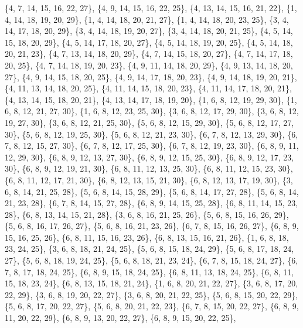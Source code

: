 \documentclass[11pt,a4paper]{article}
\begin{document}
{\{4, 7, 14, 15, 16, 22, 27\}, \{4, 9, 14, 15, 16, 22, 25\}, \{4, 13, 14, 15, 16, 21, 22\}, \{1, 4, 14, 18, 19, 20, 29\}, \{1, 4, 14, 18, 20, 21, 27\},
\{1, 4, 14, 18, 20, 23, 25\}, \{3, 4, 14, 17, 18, 20, 29\}, \{3, 4, 14, 18, 19, 20, 27\}, \{3, 4, 14, 18, 20, 21, 25\}, \{4, 5, 14, 15, 18, 20, 29\},
\{4, 5, 14, 17, 18, 20, 27\}, \{4, 5, 14, 18, 19, 20, 25\}, \{4, 5, 14, 18, 20, 21, 23\}, \{4, 7, 13, 14, 18, 20, 29\}, \{4, 7, 14, 15, 18, 20, 27\},
\{4, 7, 14, 17, 18, 20, 25\}, \{4, 7, 14, 18, 19, 20, 23\}, \{4, 9, 11, 14, 18, 20, 29\}, \{4, 9, 13, 14, 18, 20, 27\}, \{4, 9, 14, 15, 18, 20, 25\},
\{4, 9, 14, 17, 18, 20, 23\}, \{4, 9, 14, 18, 19, 20, 21\}, \{4, 11, 13, 14, 18, 20, 25\}, \{4, 11, 14, 15, 18, 20, 23\}, \{4, 11, 14, 17, 18, 20, 21\},
\{4, 13, 14, 15, 18, 20, 21\}, \{4, 13, 14, 17, 18, 19, 20\}, \{1, 6, 8, 12, 19, 29, 30\}, \{1, 6, 8, 12, 21, 27, 30\}, \{1, 6, 8, 12, 23, 25, 30\},
\{3, 6, 8, 12, 17, 29, 30\}, \{3, 6, 8, 12, 19, 27, 30\}, \{3, 6, 8, 12, 21, 25, 30\}, \{5, 6, 8, 12, 15, 29, 30\}, \{5, 6, 8, 12, 17, 27, 30\},
\{5, 6, 8, 12, 19, 25, 30\}, \{5, 6, 8, 12, 21, 23, 30\}, \{6, 7, 8, 12, 13, 29, 30\}, \{6, 7, 8, 12, 15, 27, 30\}, \{6, 7, 8, 12, 17, 25, 30\},
\{6, 7, 8, 12, 19, 23, 30\}, \{6, 8, 9, 11, 12, 29, 30\}, \{6, 8, 9, 12, 13, 27, 30\}, \{6, 8, 9, 12, 15, 25, 30\}, \{6, 8, 9, 12, 17, 23, 30\},
\{6, 8, 9, 12, 19, 21, 30\}, \{6, 8, 11, 12, 13, 25, 30\}, \{6, 8, 11, 12, 15, 23, 30\}, \{6, 8, 11, 12, 17, 21, 30\}, \{6, 8, 12, 13, 15, 21, 30\},
\{6, 8, 12, 13, 17, 19, 30\}, \{3, 6, 8, 14, 21, 25, 28\}, \{5, 6, 8, 14, 15, 28, 29\}, \{5, 6, 8, 14, 17, 27, 28\}, \{5, 6, 8, 14, 21, 23, 28\},
\{6, 7, 8, 14, 15, 27, 28\}, \{6, 8, 9, 14, 15, 25, 28\}, \{6, 8, 11, 14, 15, 23, 28\}, \{6, 8, 13, 14, 15, 21, 28\}, \{3, 6, 8, 16, 21, 25, 26\},
\{5, 6, 8, 15, 16, 26, 29\}, \{5, 6, 8, 16, 17, 26, 27\}, \{5, 6, 8, 16, 21, 23, 26\}, \{6, 7, 8, 15, 16, 26, 27\}, \{6, 8, 9, 15, 16, 25, 26\},
\{6, 8, 11, 15, 16, 23, 26\}, \{6, 8, 13, 15, 16, 21, 26\}, \{1, 6, 8, 18, 23, 24, 25\}, \{3, 6, 8, 18, 21, 24, 25\}, \{5, 6, 8, 15, 18, 24, 29\},
\{5, 6, 8, 17, 18, 24, 27\}, \{5, 6, 8, 18, 19, 24, 25\}, \{5, 6, 8, 18, 21, 23, 24\}, \{6, 7, 8, 15, 18, 24, 27\}, \{6, 7, 8, 17, 18, 24, 25\},
\{6, 8, 9, 15, 18, 24, 25\}, \{6, 8, 11, 13, 18, 24, 25\}, \{6, 8, 11, 15, 18, 23, 24\}, \{6, 8, 13, 15, 18, 21, 24\}, \{1, 6, 8, 20, 21, 22, 27\},
\{3, 6, 8, 17, 20, 22, 29\}, \{3, 6, 8, 19, 20, 22, 27\}, \{3, 6, 8, 20, 21, 22, 25\}, \{5, 6, 8, 15, 20, 22, 29\}, \{5, 6, 8, 17, 20, 22, 27\},
\{5, 6, 8, 20, 21, 22, 23\}, \{6, 7, 8, 15, 20, 22, 27\}, \{6, 8, 9, 11, 20, 22, 29\}, \{6, 8, 9, 13, 20, 22, 27\}, \{6, 8, 9, 15, 20, 22, 25\},
}
\end{document}
